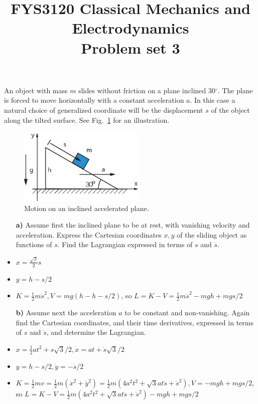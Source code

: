 \documentclass[11pt,a4paper]{report}
\title{FYS3120 Classical Mechanics and Electrodynamics\\ 
\vspace{15mm}Problem set 3}
\newcounter{excount}[chapter]
\newenvironment{exercise}[1][]{\addtocounter{excount}{1} \noindent {\bf Problem
    \arabic{excount} \ \ #1}\hspace{2mm}}{\vspace{4mm}}
\begin{document}
\maketitle


\begin{exercise}
An object with mass $m$ slides without friction on a plane inclined 30$^\circ$. The plane is forced to move horizontally with a constant acceleration $a$. In this case a natural choice of generalized coordinate will be the displacement $s$ of the object along the tilted surface. See Fig.~\ref{fig:incaccplane} for an illustration.

\begin{figure}[h]
\begin{center}
\includegraphics[width=6cm]{AkselerertSkraplan.eps}
\end{center}
\caption{Motion on an inclined accelerated plane.}
\label{fig:incaccplane}
\end{figure}

\begin{itemize}
\item[\bf a)] Assume first the inclined plane to be at rest, with vanishing velocity and acceleration. Express the Cartesian coordinates $x,y$ of the sliding object as functions of $s$. Find the Lagrangian expressed in terms of $s$ and $\dot s$.

\item $x=\frac{\sqrt{3}}{2}s$
\item $y=h-s/2$
\item $K=\frac{1}{2}m\dot{s}^2, V=mg(h-h-s/2)$, so $L=K-V=\frac{1}{2}m\dot{s}^2-mgh+mgs/2$

\item[\bf b)]  Assume next the acceleration $a$ to be constant and non-vanishing. Again find the Cartesian coordinates, and their time derivatives, expressed in terms of $s$ and $\dot s$, and determine the Lagrangian.

\item $x=\frac{1}{2} at^2+s\sqrt{3}/2, \dot{x}=at+\dot{s}\sqrt{3}/2$
\item $y=h-s/2,\dot{y}=-\dot{s}/2$
\item $K=\frac{1}{2}mv=\frac{1}{2}m( \dot{x}^2+\dot{y}^2)=\frac{1}{2}m(4a^2 t^2+\sqrt{3}at\dot{s}+\dot{s}^2), V=-mgh+mgs/2$, so $L=K-V=\frac{1}{2}m(4a^2 t^2+\sqrt{3}at\dot{s}+\dot{s}^2)-mgh+mgs/2$


\end{itemize}
\end{exercise}
\end{document}

